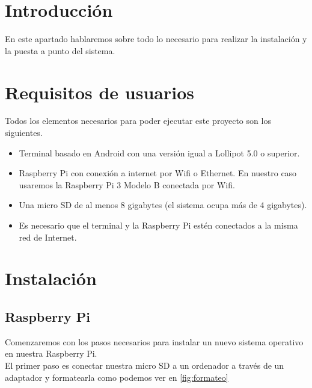 
\section{Introducción}

En este apartado hablaremos sobre todo lo necesario para realizar la instalación y la puesta a punto del sistema.

\section{Requisitos de usuarios}

Todos los elementos necesarios para poder ejecutar este proyecto son los siguientes.

\begin{itemize}
	\item Terminal basado en Android con una versión igual a Lollipot 5.0 o superior.
	\item Raspberry Pi con conexión a internet por Wifi o Ethernet. En nuestro caso usaremos la Raspberry Pi 3 Modelo B conectada por Wifi.
	\item Una micro SD de al menos 8 gigabytes (el sistema ocupa más de 4 gigabytes).
	\item Es necesario que el terminal y la Raspberry Pi estén conectados a la misma red de Internet.
\end{itemize}
\section{Instalación}

\subsection{Raspberry Pi}\label{sec:instalacionRaspberry}

Comenzaremos con los pasos necesarios para instalar un nuevo sistema operativo en nuestra Raspberry Pi.\\
El primer paso es conectar nuestra micro SD a un ordenador a través de un adaptador y formatearla como podemos ver en \ref{fig:formateo}

